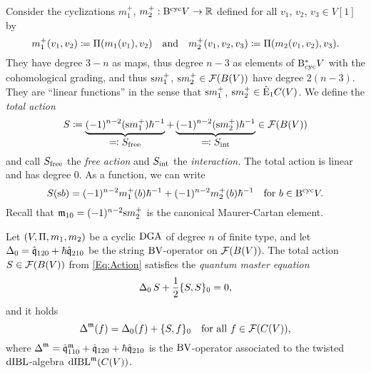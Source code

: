 \documentclass[\MainFolder/Text.tex]{subfiles}
\begin{document}
Consider the cyclizations $m^+_1$, $m^+_2: \mathrm{B}^{\mathrm{cyc}} V \rightarrow \mathbb{R}$ defined for all $v_1$, $v_2$, $v_3 \in V[1]$ by
$$ m_1^+(v_1,v_2)\coloneqq \Pi(m_1(v_1),v_2)\quad\text{and}\quad m^+_2(v_1,v_2,v_3)\coloneqq \Pi(m_2(v_1,v_2),v_3). $$
They have degree $3-n$ as maps, thus degree $n-3$ as elements of $\mathrm{B}_{\mathrm{cyc}}^* V$ with the cohomological grading, and thus $\mathrm{s} m^+_1$, $\mathrm{s} m^+_2\in \mathcal{F}(B(V))$ have degree $2(n-3)$. They are ``linear functions'' in the sense that $\mathrm{s} m^+_1$, $\mathrm{s} m^+_2 \in \hat{\mathrm{E}}_1C(V)$. We define the \emph{total action}
\begin{equation}\label{Eq:Action}
 S \coloneqq \underbrace{(-1)^{n-2}(\mathrm{s} m_1^+)\hbar^{-1}}_{\displaystyle\eqqcolon S_{\mathrm{free}}} + \underbrace{(-1)^{n-2}(\mathrm{s} m_2^+)\hbar^{-1}}_{\displaystyle \eqqcolon S_{\mathrm{int}}}\in \mathcal{F}(B(V))
\end{equation}
and call $S_{\mathrm{free}}$ the \emph{free action} and $S_{\mathrm{int}}$ the \emph{interaction.} The total action is linear and has degree $0$. As a function, we can write 
$$ S(\mathrm{s} b) = (-1)^{n-2}m_1^+(b) \hbar^{-1} + (-1)^{n-2} m_2^+(b) \hbar^{-1}\quad\text{for }b\in \mathrm{B}^{\mathrm{cyc}} V.$$
Recall that $\mathfrak{m}_{10} = (-1)^{n-2}\mathrm{s} m_2^+$ is the canonical Maurer-Cartan element.

\begin{Proposition}\label{Prop:BVActForCanMC}
Let $(V,\Pi,m_1,m_2)$ be a cyclic $\mathrm{DGA}$ of degree $n$ of finite type, and let $\operatorname{\Delta}_0 = \hat{\mathfrak{q}}_{120} + \hbar \hat{\mathfrak{q}}_{210}$ be the string $\mathrm{BV}$-operator on $\mathcal{F}(B(V))$. The total action $S\in \mathcal{F}(B(V))$ from \eqref{Eq:Action} satisfies the \emph{quantum master equation} 
\begin{equation}\label{Eq:QME}
 \operatorname{\Delta}_0 S + \frac{1}{2}\{S,S\}_0 = 0,
\end{equation}
and it holds
\begin{equation}\label{Eq:Twist}
 \operatorname{\Delta}^{\mathfrak{m}}(f)= \operatorname{\Delta}_0(f) + \{S,f\}_0\quad\text{for all }f\in \mathcal{F}(C(V)),
\end{equation}
where $\operatorname{\Delta}^{\mathfrak{m}} = \hat{\mathfrak{q}}_{110}^{\mathfrak{m}} + \hat{\mathfrak{q}}_{120} + \hbar \hat{\mathfrak{q}}_{210}$ is the $\mathrm{BV}$-operator associated to the twisted $\mathrm{dIBL}$-algebra $\mathrm{dIBL}^{\mathfrak{m}}(C(V))$.
\end{Proposition}
\end{document}
